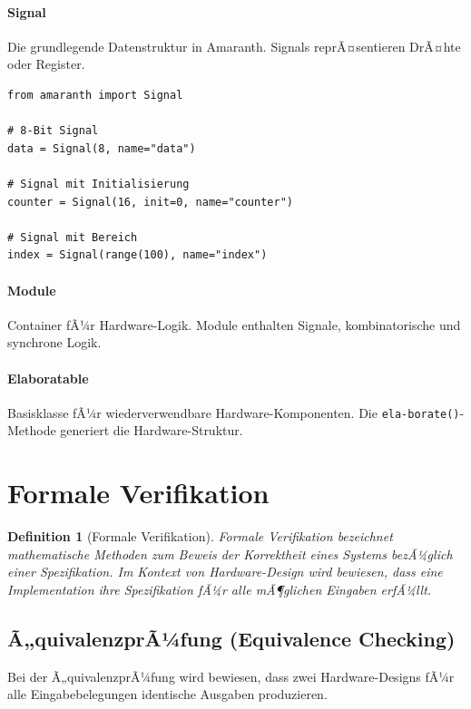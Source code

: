 ﻿\documentclass[12pt,a4paper]{report}
\newtheorem{definition}{Definition}[section]
\begin{document}
\paragraph{Signal}
Die grundlegende Datenstruktur in Amaranth. Signals reprÃ¤sentieren DrÃ¤hte oder Register.

\begin{lstlisting}[style=pythonstyle, caption={Amaranth Signal-Deklaration}]
from amaranth import Signal

# 8-Bit Signal
data = Signal(8, name="data")

# Signal mit Initialisierung
counter = Signal(16, init=0, name="counter")

# Signal mit Bereich
index = Signal(range(100), name="index")
\end{lstlisting}

\paragraph{Module}
Container fÃ¼r Hardware-Logik. Module enthalten Signale, kombinatorische und synchrone Logik.

\paragraph{Elaboratable}
Basisklasse fÃ¼r wiederverwendbare Hardware-Komponenten. Die \texttt{ela-\newline borate()}-Methode generiert die Hardware-Struktur.

\section{Formale Verifikation}

\begin{definition}[Formale Verifikation]
Formale Verifikation bezeichnet mathematische Methoden zum Beweis der Korrektheit eines Systems bezÃ¼glich einer Spezifikation. Im Kontext von Hardware-Design wird bewiesen, dass eine Implementation ihre Spezifikation fÃ¼r alle mÃ¶glichen Eingaben erfÃ¼llt.
\end{definition}

\subsection{Ã„quivalenzprÃ¼fung (Equivalence Checking)}

Bei der Ã„quivalenzprÃ¼fung wird bewiesen, dass zwei Hardware-Designs fÃ¼r alle Eingabebelegungen identische Ausgaben produzieren.
\end{document}
